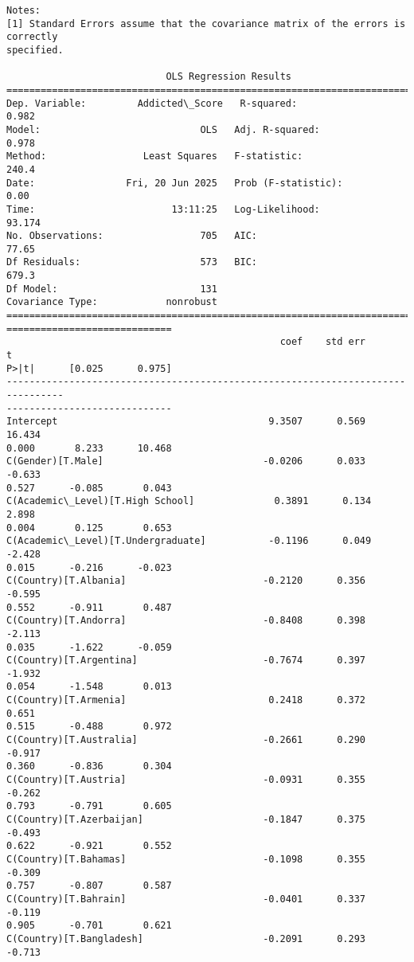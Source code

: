 \documentclass[11pt]{article}
\begin{document}
\begin{Verbatim}[commandchars=\\\{\}]
Notes:
[1] Standard Errors assume that the covariance matrix of the errors is correctly
specified.

                            OLS Regression Results
==============================================================================
Dep. Variable:         Addicted\_Score   R-squared:                       0.982
Model:                            OLS   Adj. R-squared:                  0.978
Method:                 Least Squares   F-statistic:                     240.4
Date:                Fri, 20 Jun 2025   Prob (F-statistic):               0.00
Time:                        13:11:25   Log-Likelihood:                 93.174
No. Observations:                 705   AIC:                             77.65
Df Residuals:                     573   BIC:                             679.3
Df Model:                         131
Covariance Type:            nonrobust
================================================================================
=============================
                                                coef    std err          t
P>|t|      [0.025      0.975]
--------------------------------------------------------------------------------
-----------------------------
Intercept                                     9.3507      0.569     16.434
0.000       8.233      10.468
C(Gender)[T.Male]                            -0.0206      0.033     -0.633
0.527      -0.085       0.043
C(Academic\_Level)[T.High School]              0.3891      0.134      2.898
0.004       0.125       0.653
C(Academic\_Level)[T.Undergraduate]           -0.1196      0.049     -2.428
0.015      -0.216      -0.023
C(Country)[T.Albania]                        -0.2120      0.356     -0.595
0.552      -0.911       0.487
C(Country)[T.Andorra]                        -0.8408      0.398     -2.113
0.035      -1.622      -0.059
C(Country)[T.Argentina]                      -0.7674      0.397     -1.932
0.054      -1.548       0.013
C(Country)[T.Armenia]                         0.2418      0.372      0.651
0.515      -0.488       0.972
C(Country)[T.Australia]                      -0.2661      0.290     -0.917
0.360      -0.836       0.304
C(Country)[T.Austria]                        -0.0931      0.355     -0.262
0.793      -0.791       0.605
C(Country)[T.Azerbaijan]                     -0.1847      0.375     -0.493
0.622      -0.921       0.552
C(Country)[T.Bahamas]                        -0.1098      0.355     -0.309
0.757      -0.807       0.587
C(Country)[T.Bahrain]                        -0.0401      0.337     -0.119
0.905      -0.701       0.621
C(Country)[T.Bangladesh]                     -0.2091      0.293     -0.713

\end{Verbatim}
\end{document}
